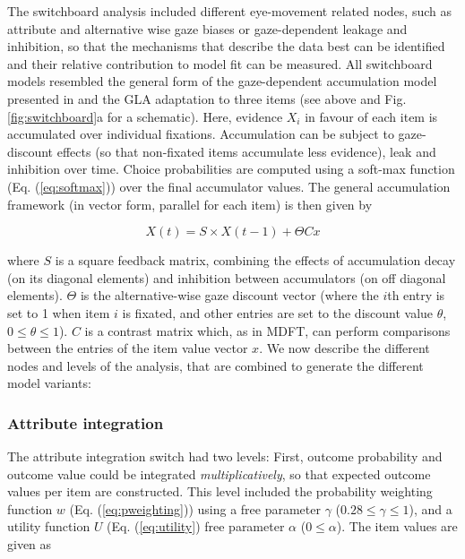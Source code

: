 \documentclass[11pt, a4paper]{article}
\begin{document}
The switchboard analysis included different eye-movement related nodes, such as attribute and alternative wise gaze biases or gaze-dependent leakage and inhibition, so that the mechanisms that describe the data best can be identified and their relative contribution to model fit can be measured. All switchboard models resembled the general form of the gaze-dependent accumulation model presented in \citeauthor{glickman2019FormationPreferenceRisky} \autocite{glickman2019FormationPreferenceRisky} and the GLA adaptation to three items (see above and Fig. \ref{fig:switchboard}a for a schematic). Here, evidence $X_i$ in favour of each item is accumulated over individual fixations. Accumulation can be subject to gaze-discount effects (so that non-fixated items accumulate less evidence), leak and inhibition over time. Choice probabilities are computed using a soft-max function (Eq. (\ref{eq:softmax})) over the final accumulator values. The general accumulation framework (in vector form, parallel for each item) is then given by

\begin{equation}
  X(t) = S \times X(t-1) + \Theta C x
\end{equation}

where $S$ is a square feedback matrix, combining the effects of accumulation decay (on its diagonal elements) and inhibition between accumulators (on off diagonal elements). $\Theta$ is the alternative-wise gaze discount vector (where the $i$th entry is set to 1 when item $i$ is fixated, and other entries are set to the discount value $\theta$, $0 \le \theta \le 1$). $C$ is a contrast matrix which, as in MDFT, can perform comparisons between the entries of the item value vector $x$.
We now describe the different nodes and levels of the analysis, that are combined to generate the different model variants:

\subsubsection*{Attribute integration}
The attribute integration switch had two levels:
First, outcome probability and outcome value could be integrated \emph{multiplicatively}, so that expected outcome values per item are constructed. This level included the probability weighting function $w$ (Eq. (\ref{eq:pweighting})) using a free parameter $\gamma$ ($0.28 \le \gamma \le 1$), and a utility function $U$ (Eq. (\ref{eq:utility}) free parameter $\alpha$ ($0 \le \alpha$).
The item values are given as
\end{document}
